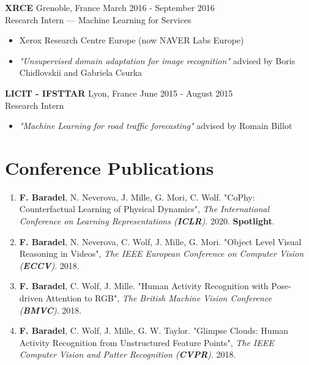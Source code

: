 \documentclass[10pt]{res} %
\begin{document}
\begin{resume}
\textbf{XRCE} \hfill Grenoble, France \hfill March 2016 - September 2016 \\
Research Intern --- Machine Learning for Services
\begin{itemize}
\item Xerox Research Centre Europe (now NAVER Labs Europe)
\item \textit{"Unsupervised domain adaptation for image recognition"} advised by  Boris Chidlovskii and Gabriela Csurka
\end{itemize}

\textbf{LICIT - IFSTTAR} \hfill Lyon, France \hfill June 2015 - August 2015 \\
Research Intern
\begin{itemize}
\item \textit{"Machine Learning for road traffic forecasting"} advised by Romain Billot
\end{itemize}


\section{\large Conference Publications} 
\begin{enumerate}[wide=0pt]
	\item \textbf{F. Baradel}, N. Neverova, J. Mille, G. Mori, C. Wolf. "CoPhy: Counterfactual Learning of Physical Dynamics", \textit{The International Conference on Learning Representations (\textbf{ICLR})}. 2020. \textbf{Spotlight}.
	\item \textbf{F. Baradel}, N. Neverova, C. Wolf, J. Mille, G. Mori. "Object Level Visual Reasoning in Videos", \textit{The IEEE European Conference on Computer Vision (\textbf{ECCV})}. 2018.
	\item \textbf{F. Baradel}, C. Wolf, J. Mille. "Human Activity Recognition with Pose-driven Attention to RGB", \textit{The British Machine Vision Conference (\textbf{BMVC})}. 2018.
	\item \textbf{F. Baradel}, C. Wolf, J. Mille, G. W. Taylor. "Glimpse Clouds: Human Activity Recognition from Unstructured Feature Points", \textit{The IEEE Computer Vision and Patter Recognition (\textbf{CVPR})}. 2018.
\end{enumerate}




\end{resume}
\end{document}
